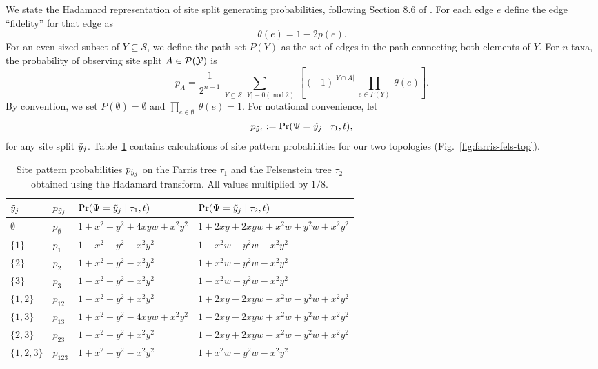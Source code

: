 We state the Hadamard representation of site split generating probabilities, following Section 8.6 of \cite{Semple2003-em}.
For each edge $e$ define the edge ``fidelity'' for that edge as
$$
\theta(e) = 1-2p(e).
$$
For an even-sized subset of $Y\subseteq\mathcal{S}$, we define the path set $P(Y)$ as the set of edges in the path connecting both elements of $Y$.
For $n$ taxa, the probability of observing site split $A\in\mathcal{P}(\mathcal{Y})$ is
\begin{equation}
\label{eq:hadamard_probability}
p_A = \frac{1}{2^{n-1}} \ \sum_{Y \subseteq \mathcal{S} : |Y| \equiv 0 (\mathrm{mod} \ 2)} \ \left[(-1)^{|Y \cap A|} \ \prod_{e\in P(Y)} \ \theta(e) \right].
\end{equation}
By convention, we set $P(\emptyset)=\emptyset$ and $\prod_{e\in\emptyset} \ \theta(e) = 1$.
For notational convenience, let
$$
p_{\tilde{y}_j} := \Pr(\Psi=\tilde{y}_j \mid \tau_1,t),
$$
for any site split $\tilde{y}_j$.
Table~\ref{tab:sitepatprob} contains calculations of site pattern probabilities for our two topologies (Fig.~\ref{fig:farris-fels-top}).

\begin{table}[ht]
\centering
\begin{tabular}{|l|l|l|l|}
    \hline
$\tilde{y}_j$  & $p_{\tilde{y}_j}$ &$\Pr(\Psi=\tilde{y}_j \mid \tau_1,t)$&$\Pr(\Psi=\tilde{y}_j \mid \tau_2,t)$\\
    \hline
    $\emptyset$ & $p_{\emptyset}$   &$1+x^2+y^2+4xyw+x^2y^2$&$1+2xy+2xyw+x^2w+y^2w+x^2y^2$\\
    $\{1\}$     & $p_{1}$   &$1-x^2+y^2-x^2y^2$&$1-x^2w+y^2w-x^2y^2$\\
    $\{2\}$     & $p_{2}$   &$1+x^2-y^2-x^2y^2$&$1+x^2w-y^2w-x^2y^2$\\
    $\{3\}$     & $p_{3}$   &$1-x^2+y^2-x^2y^2$&$1-x^2w+y^2w-x^2y^2$\\
    $\{1,2\}$   & $p_{12}$   &$1-x^2-y^2+x^2y^2$&$1+2xy-2xyw-x^2w-y^2w+x^2y^2$\\
    $\{1,3\}$   & $p_{13}$   &$1+x^2+y^2-4xyw+x^2y^2$&$1-2xy-2xyw+x^2w+y^2w+x^2y^2$\\
    $\{2,3\}$   & $p_{23}$   &$1-x^2-y^2+x^2y^2$&$1-2xy+2xyw-x^2w-y^2w+x^2y^2$\\
    $\{1,2,3\}$ & $p_{123}$   &$1+x^2-y^2-x^2y^2$&$1+x^2w-y^2w-x^2y^2$\\
    \hline
\end{tabular}
\caption{Site pattern probabilities $p_{\tilde{y}_j}$ on the Farris tree $\tau_1$ and the Felsenstein tree $\tau_2$ obtained using the Hadamard transform.
All values multiplied by $1/8$.}
\label{tab:sitepatprob}
\end{table}

